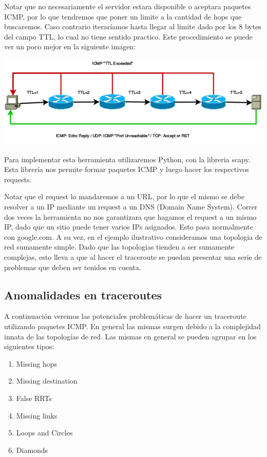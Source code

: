 Notar que no necesariamente el servidor estara disponible o aceptara paquetes ICMP, por lo que tendremos que poner un limite a la cantidad de hops que buscaremos. Caso contrario iteraríamos hasta llegar al limite dado por los 8 bytes del campo TTL, lo cual no tiene sentido practico. Este procedimiento se puede ver un poco mejor en la siguiente imagen:

\includegraphics[width=\textwidth,keepaspectratio]{images/traceroute_typical}

Para implementar esta herramienta utilizaremos Python, con la libreria scapy. Esta librería nos permite formar paquetes ICMP y luego hacer los respectivos requests.

Notar que el request lo mandaremos a un URL, por lo que el mismo se debe resolver a un IP mediante un request a un DNS (Domain Name System). Correr dos veces la herramienta no nos garantizara que hagamos el request a un mismo IP, dado que un sitio puede tener varios IPs asignados. Esto pasa normalmente con google.com. A su vez, en el ejemplo ilustrativo consideramos una topologia de red sumamente simple. Dado que las topologias tienden a ser sumamente complejas, esto lleva a que al hacer el traceroute se puedan presentar una serie de problemas que deben ser tenidos en cuenta.

\subsection{Anomalidades en traceroutes}

A continuación veremos las potenciales problemáticas de hacer un traceroute utilizando paquetes ICMP. En general las mismas surgen debido a la complejidad innata de las topologías de red. Las mismas en general se pueden agrupar en los siguientes tipos:

\begin{enumerate}
	\item Missing hops
	\item Missing destination
	\item False RRTs
	\item Missing links
	\item Loops and Circles
	\item Diamonds
\end{enumerate}
